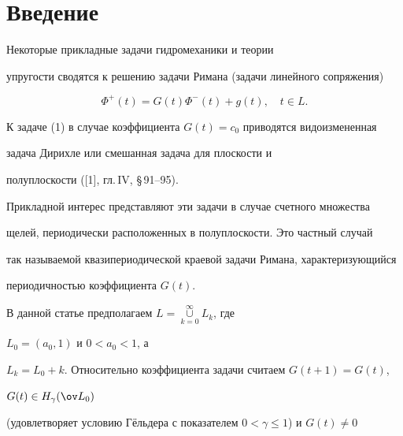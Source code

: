  




\maketitle 


\label{begin} 


 


 


 


\section{Введение} 


 


Некоторые прикладные задачи гидромеханики и теории 


упругости сводятся к решению задачи Римана (задачи линейного сопряжения) 


\begin{equation} 


\Phi^+(t)=G(t)\Phi^-(t)+g(t),\quad t\in L. 


\end{equation} 


К задаче (1) в случае коэффициента $G(t)=c_0$ приводятся видоизмененная 


задача Дирихле или смешанная задача для плоскости и 


полуплоскости ([1], гл.\,IV, \S\,91--95). 


Прикладной интерес представляют эти задачи в случае счетного множества 


щелей, периодически расположенных в полуплоскости. Это частный случай 


так называемой квазипериодической краевой задачи Римана, характеризующийся 


периодичностью коэффициента $G(t)$. 


 


В данной статье предполагаем $L=\mathop{\cup}\limits^\infty_{k=0}L_k$, где 


$L_0=(a_0,1)$ и $0<a_0<1$, а 


$L_k=L_0+k$. Относительно коэффициента задачи считаем $G(t+1)=G(t)$, 


$G(t)\in H_\gamma(\ov L_0)$ 


(удовлетворяет условию Г\"ельдера с показателем $0<\gamma\le1$) и $G(t)\ne0$ 


